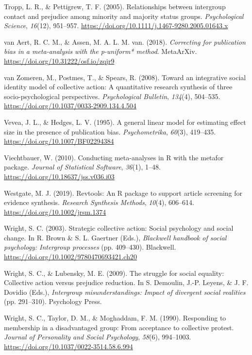 \documentclass[twocolumn, 11pt, letterpaper]{article}
\begin{document}
\leavevmode\hypertarget{ref-tropp_relationships_2005}{}%
Tropp, L. R., \& Pettigrew, T. F. (2005). Relationships between
intergroup contact and prejudice among minority and majority status
groups. \emph{Psychological Science}, \emph{16}(12), 951--957.
\url{https://doi.org/10.1111/j.1467-9280.2005.01643.x}

\leavevmode\hypertarget{ref-van_aert_correcting_2018}{}%
van Aert, R. C. M., \& Assen, M. A. L. M. van. (2018). \emph{Correcting
for publication bias in a meta-analysis with the p-uniform* method}.
MetaArXiv. \url{https://doi.org/10.31222/osf.io/zqjr9}

\leavevmode\hypertarget{ref-van_zomeren_toward_2008}{}%
van Zomeren, M., Postmes, T., \& Spears, R. (2008). Toward an
integrative social identity model of collective action: A quantitative
research synthesis of three socio-psychological perspectives.
\emph{Psychological Bulletin}, \emph{134}(4), 504--535.
\url{https://doi.org/10.1037/0033-2909.134.4.504}

\leavevmode\hypertarget{ref-vevea_general_1995}{}%
Vevea, J. L., \& Hedges, L. V. (1995). A general linear model for
estimating effect size in the presence of publication bias.
\emph{Psychometrika}, \emph{60}(3), 419--435.
\url{https://doi.org/10.1007/BF02294384}

\leavevmode\hypertarget{ref-viechtbauer_conducting_2010}{}%
Viechtbauer, W. (2010). Conducting meta-analyses in R with the metafor
package. \emph{Journal of Statistical Software}, \emph{36}(1), 1--48.
\url{https://doi.org/10.18637/jss.v036.i03}

\leavevmode\hypertarget{ref-westgate_revtools:_2019}{}%
Westgate, M. J. (2019). Revtools: An R package to support article
screening for evidence synthesis. \emph{Research Synthesis Methods},
\emph{10}(4), 606--614. \url{https://doi.org/10.1002/jrsm.1374}

\leavevmode\hypertarget{ref-brown_strategic_2003}{}%
Wright, S. C. (2003). Strategic collective action: Social psychology and
social change. In R. Brown \& S. L. Gaertner (Eds.), \emph{Blackwell
handbook of social psychology: Intergroup processes} (pp. 409--430).
Blackwell. \url{https://doi.org/10.1002/9780470693421.ch20}

\leavevmode\hypertarget{ref-wright_struggle_2009}{}%
Wright, S. C., \& Lubensky, M. E. (2009). The struggle for social
equality: Collective action versus prejudice reduction. In S. Demoulin,
J.-P. Leyens, \& J. F. Dovidio (Eds.), \emph{Intergroup
misunderstandings: Impact of divergent social realities} (pp. 291--310).
Psychology Press.

\leavevmode\hypertarget{ref-wright_responding_1990}{}%
Wright, S. C., Taylor, D. M., \& Moghaddam, F. M. (1990). Responding to
membership in a disadvantaged group: From acceptance to collective
protest. \emph{Journal of Personality and Social Psychology},
\emph{58}(6), 994--1003.
\url{https://doi.org/10.1037/0022-3514.58.6.994}

\endgroup
\end{document}
